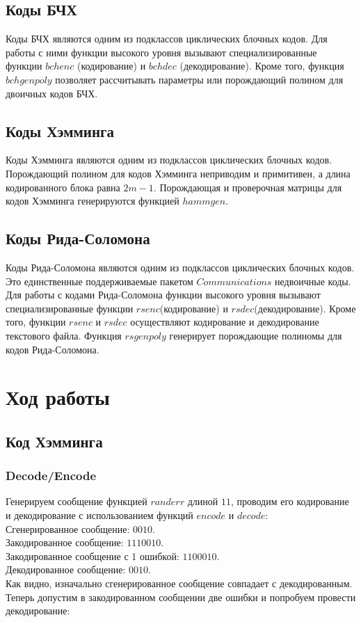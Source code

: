 \documentclass[a4paper]{article}
\begin{document}
\subsection{Коды БЧХ}
Коды БЧХ являются одним из подклассов циклических блочных кодов. Для работы с ними функции высокого уровня вызывают специализированные функции $bchenc$ (кодирование) и $bchdec$ (декодирование). Кроме того, функция $bchgenpoly$ позволяет рассчитывать параметры или порождающий полином для двоичных кодов БЧХ.
\subsection{Коды Хэмминга}
Коды Хэмминга являются одним из подклассов циклических блочных кодов. Порождающий полином для кодов Хэмминга неприводим и примитивен, а длина кодированного блока равна $2m-1$. Порождающая и проверочная матрицы для кодов Хэмминга генерируются функцией $hammgen$.
\subsection{Коды Рида-Соломона}
Коды Рида-Соломона являются одним из подклассов циклических блочных кодов. Это единственные поддерживаемые пакетом $Communications$ недвоичные коды. Для работы с кодами Рида-Соломона функции высокого уровня вызывают специализированные функции $rsenc$(кодирование) и $rsdec$(декодирование). Кроме того, функции $rsenc$ и $rsdec$ осуществляют кодирование и декодирование текстового файла. Функция $rsgenpoly$ генерирует порождающие полиномы для кодов Рида-Соломона.
\section{Ход работы}
\subsection{Код Хэмминга}
\subsubsection{Decode/Encode}
Генерируем сообщение функцией $randerr$ длиной $11$, проводим его кодирование и декодирование с использованием функций $encode$ и $decode$:
\\
Сгенерированное сообщение: 
$0 0 1 0$.\\
Закодированное сообщение:
$ 1 1 1 0 0 1 0$.\\
Закодированное сообщение с 1 ошибкой:
$1 1 0 0 0 1 0$.\\
Декодированное сообщение:
$0 0 1 0$.\\
Как видно, изначально сгенерированное сообщение совпадает с декодированным.\\
Теперь допустим в закодированном сообщении две ошибки и попробуем провести декодирование:\\
\end{document}
